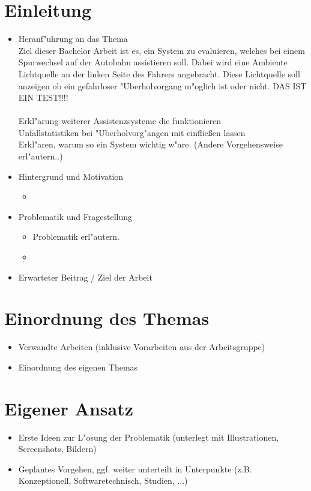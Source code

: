 \documentclass[a4paper, 11pt]{article}
\begin{document}
\section{Einleitung}
\begin{itemize}
\item Heranf"{u}hrung an das Thema\\
Ziel dieser Bachelor Arbeit ist es, ein System zu evaluieren, welches bei einem Spurwechsel auf der Autobahn assistieren soll. Dabei wird eine Ambiente Lichtquelle an der linken Seite des Fahrers angebracht. Diese Lichtquelle soll anzeigen ob ein gefahrloser "{U}berholvorgang m"{o}glich ist oder nicht. DAS IST EIN TEST!!!! \\
\\
Erkl"{a}rung weiterer Assistenzsysteme die funktionieren\\
Unfallstatistiken bei "{U}berholvorg"{a}ngen mit einflie{\ss}en lassen\\
Erkl"{a}ren, warum so ein System wichtig w"{a}re. (Andere Vorgehensweise erl"{a}utern..)\\


\item Hintergrund und Motivation
	\begin{itemize}
	\item{}
	\end{itemize}
\item Problematik und Fragestellung
	\begin{itemize}
	\item{Problematik erl"{a}utern.}
	\item{}
	\end{itemize}
\item Erwarteter Beitrag / Ziel der Arbeit
\end{itemize}

\section{Einordnung des Themas}
\begin{itemize}
\item Verwandte Arbeiten (inklusive Vorarbeiten aus der Arbeitsgruppe)
\item Einordnung des eigenen Themas
\end{itemize}

\section{Eigener Ansatz}
\begin{itemize}
\item Erste Ideen zur L"{o}sung der Problematik (unterlegt mit Illustrationen, Screenshots, Bildern)\\
\item Geplantes Vorgehen, ggf. weiter unterteilt in Unterpunkte (z.B. Konzeptionell, Softwaretechnisch, Studien, ...)
\end{itemize}
\end{document}
